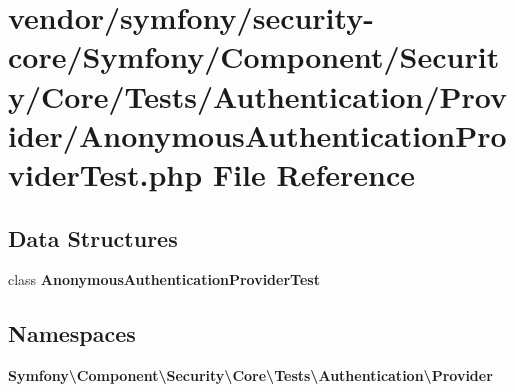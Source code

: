 \section{vendor/symfony/security-\/core/\+Symfony/\+Component/\+Security/\+Core/\+Tests/\+Authentication/\+Provider/\+Anonymous\+Authentication\+Provider\+Test.php File Reference}
\label{_anonymous_authentication_provider_test_8php}
\subsection*{Data Structures}
\begin{DoxyCompactItemize}
\item 
class {\bf Anonymous\+Authentication\+Provider\+Test}
\end{DoxyCompactItemize}
\subsection*{Namespaces}
\begin{DoxyCompactItemize}
\item 
 {\bf Symfony\textbackslash{}\+Component\textbackslash{}\+Security\textbackslash{}\+Core\textbackslash{}\+Tests\textbackslash{}\+Authentication\textbackslash{}\+Provider}
\end{DoxyCompactItemize}
